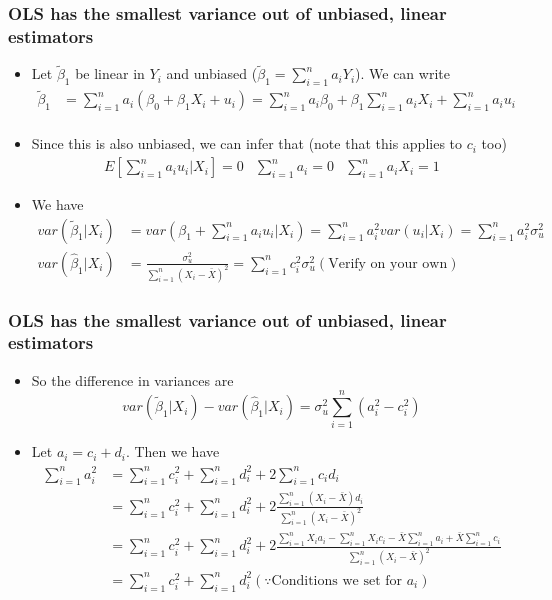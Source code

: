 \documentclass[aspectratio=169]{beamer}
\begin{document}
\begin{frame}
\frametitle{OLS has the smallest variance out of unbiased, linear estimators}
\begin{itemize}
\item Let $\tilde{\beta}_1$ be linear in $Y_i$ and unbiased ($\tilde{\beta}_1=\sum_{i=1}^n a_iY_i$). We can write
\[
\begin{aligned}
\tilde{\beta}_1 &= \sum_{i=1}^n a_i(\beta_0+\beta_1X_i+u_i)= \sum_{i=1}^n a_i\beta_0+\beta_1\sum_{i=1}^na_iX_i+\sum_{i=1}^na_iu_i \\
\end{aligned}
\] 
\item Since this is also unbiased, we can infer that (note that this applies to $c_i$ too)
\footnotesize{\[
\begin{aligned}
E\left[\sum_{i=1}^n a_iu_i|X_i\right]=0 & \sum_{i=1}^n a_i=0 &  \sum_{i=1}^n a_iX_i=1 
\end{aligned}
\]}
\item We have
\small{\[
\begin{aligned}
var(\tilde{\beta}_1|X_i)&=var({\beta}_1+\sum_{i=1}^n a_iu_i|X_i)=\sum_{i=1}^n a_i^2 var(u_i|X_i) = \sum_{i=1}^n a_i^2 \sigma_u^2\\
var(\hat{\beta}_1|X_i)&=\frac{\sigma_u^2}{\sum_{i=1}^n(X_i-\bar{X})^2 }=\sum_{i=1}^n c_i^2\sigma_u^2 (\text{Verify on your own})
\end{aligned}
\]
}
\end{itemize}
\end{frame}


\begin{frame}
\frametitle{OLS has the smallest variance out of unbiased, linear estimators}
\begin{itemize}
\item So the difference in variances are
\[
var(\tilde{\beta}_1|X_i)-var(\hat{\beta}_1|X_i) = \sigma_u^2\sum_{i=1}^n (a_i^2-c_i^2)
\]
\item Let $a_i = c_i+d_i$. Then we have
\[
\begin{aligned}
\sum_{i=1}^n a_i^2&= \sum_{i=1}^n c_i^2+\sum_{i=1}^n d_i^2+2\sum_{i=1}^nc_id_i\\
&=\sum_{i=1}^n c_i^2+\sum_{i=1}^n d_i^2 + 2 \frac{\sum_{i=1}^n (X_i-\bar{X})d_i}{\sum_{i=1}^n(X_i-\bar{X})^2} \\
&=\sum_{i=1}^n c_i^2+\sum_{i=1}^n d_i^2 + 2 \frac{\sum_{i=1}^n X_ia_i-\sum_{i=1}^nX_ic_i-\bar{X}\sum_{i=1}^na_i+\bar{X}\sum_{i=1}^nc_i}{\sum_{i=1}^n(X_i-\bar{X})^2}\\
&=\sum_{i=1}^n c_i^2+\sum_{i=1}^n d_i^2 (\because\text{Conditions we set for $a_i$})\\
\end{aligned}
\]
\end{itemize}
\end{frame}
\end{document}
